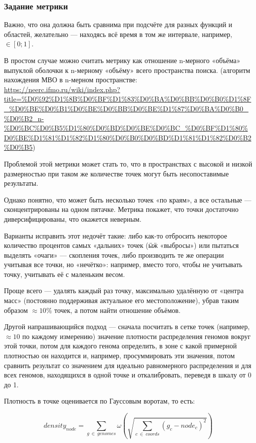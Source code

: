 \subsubsection{Задание метрики}
Важно, что она должна быть сравнима при подсчёте для разных функций и областей, желательно — находясь всё время в том же интервале, например,
$\in [0; 1]$.

В простом случае можно считать метрику как отношение n-мерного «объёма» выпуклой оболочки к n-мерному «объёму» всего пространства поиска.
(алгоритм нахождения МВО в n-мерном пространстве: \url{https://neerc.ifmo.ru/wiki/index.php?title=%D0%92%D1%8B%D0%BF%D1%83%D0%BA%D0%BB%D0%B0%D1%8F_%D0%BE%D0%B1%D0%BE%D0%BB%D0%BE%D1%87%D0%BA%D0%B0_%D0%B2_n-%D0%BC%D0%B5%D1%80%D0%BD%D0%BE%D0%BC_%D0%BF%D1%80%D0%BE%D1%81%D1%82%D1%80%D0%B0%D0%BD%D1%81%D1%82%D0%B2%D0%B5})

Проблемой этой метрики может стать то, что в пространствах с высокой и низкой  размерностью при таком же количестве точек могут быть несопоставимые результаты.

Однако понятно, что может быть несколько точек «по краям», а все остальные — сконцентрированы на одном пятачке.
Метрика покажет, что точки достаточно диверсифицированы, что окажется неверным.

Варианты исправить этот недочёт такие:
либо как-то отбросить некоторое количество процентов самых «дальних» точек (ӹӝ «выбросы») или пытаться выделять «очаги» — скопления точек,
либо производить те же операции учитывая все точки, но «нечётко»: например, вместо того, чтобы не учитывать точку, учитывать её с маленьким весом.

Проще всего — удалять каждый раз точку, максимально удалённую от «центра масс» (постоянно поддерживая актуальное его местоположение),
убрав таким образом $\approx 10\%$ точек, а потом найти отношение объёмов.

Другой напрашивающийся подход — сначала посчитать в сетке точек (например, $\approx 10$ по каждому измерению)
значение плотности распределения геномов вокруг этой точки, потом для каждого генома определить, в зоне с какой примерной плотностью он находится и, например, просуммировать эти значения,
потом сравнить результат со значением для идеально равномерного распределения и для всех геномов, находящихся в одной точке и откалибровать, переведя в шкалу от 0 до 1.

Плотность в точке оценивается по Гауссовым воротам, то есть:

\begin{equation}
    density_{node} = \sum_{g~\in~genomes} {\omega} \left( \sqrt{\sum_{c~\in~coords} \left(g_{c} - node_c \right)^2} \right)
\end{equation}


